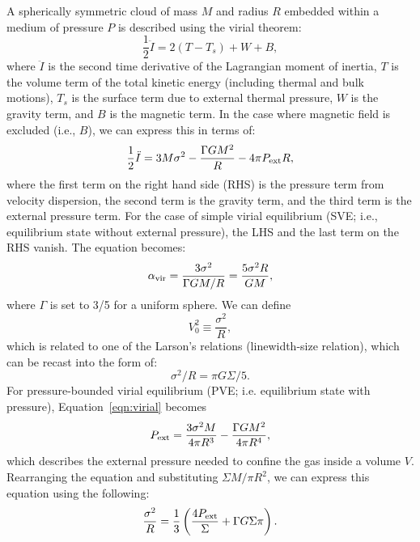 \IfFileExists{emulateapjlegacy.cls}{\documentclass[iop]{emulateapjlegacy}}{\documentclass[iop]{emulateapj}}
\begin{document}
A spherically symmetric cloud of mass $M$ and radius $R$ embedded within
a medium of pressure $P$ is described using the virial theorem:
\begin{equation}
\frac{1}{2}\ddot I = 2(T - T_s) + W + B,
\end{equation}
where $\ddot I$ is the second time derivative of the Lagrangian moment of inertia,
$T$ is the volume term of the total kinetic energy (including thermal and
bulk motions), $T_s$ is the surface term due to external thermal pressure,
$W$ is the gravity term, and $B$ is the magnetic term.
In the case where magnetic field is excluded (i.e., $B$), we can express this in terms of:
\begin{equation}
\frac{1}{2}\ddot I = 3 M \sigma^2 - \frac{\Gamma GM^2}{R} - 4\pi P_{\rm ext} R,
\label{eqn:virial}
\end{equation}
where the first term on the right hand side (RHS) is the pressure term from velocity dispersion, the second
term is the gravity term, and the third term is the external pressure term.
For the case of simple virial equilibrium (SVE; i.e., equilibrium state without external pressure),
the LHS and the last term on the RHS vanish. The equation becomes:
\begin{equation}
\alpha_{\rm vir} = \frac{3\sigma^2}{\Gamma GM/R} = \frac{5\sigma^2R}{GM},
\label{eqn:alpha}
\end{equation}
where $\Gamma$ is set to 3/5 for a uniform sphere.
We can define
\begin{equation}
V_0^2\equiv\frac{\sigma^2}{R},
\end{equation}
which is related to one of the Larson's relations (linewidth-size relation), 
which can be recast into the form of:
\begin{equation}
\sigma^2/R = \pi G \Sigma/5.
\end{equation}
For pressure-bounded virial equilibrium (PVE; i.e. equilibrium state with pressure), %
Equation~\ref{eqn:virial} becomes
\begin{equation}
P_{\rm ext} = \frac{3\sigma^2M}{4\pi R^3} - \frac{\Gamma G M^2}{4\pi R^4},
\label{eqn:pext}
\end{equation}
which describes the external pressure needed to confine the gas inside a volume $V$.
Rearranging the equation and substituting $\Sigma$\eq$M/\pi R^2$, we can express
this equation using the following:
\begin{equation}
\frac{\sigma^2}{R} = \frac{1}{3}\left(\frac{4P_{\rm ext}}{\Sigma} + \Gamma G \Sigma \pi \right).
\label{eqn:v0}
\end{equation}
\end{document}
